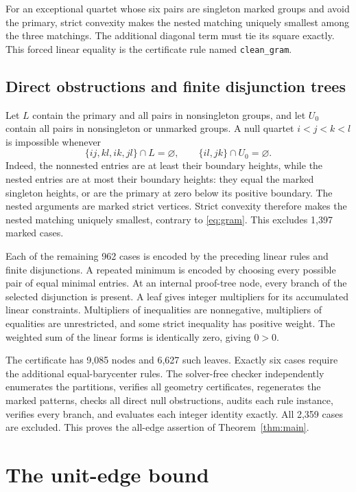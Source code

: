 \documentclass[11pt]{article}
\theoremstyle{remark}\newtheorem{remark}[theorem]{Remark}
\begin{document}
For an exceptional quartet whose six pairs are singleton marked groups
and avoid the primary, strict convexity makes the nested matching
uniquely smallest among the three matchings. The additional diagonal
term must tie its square exactly. This forced linear equality is the
certificate rule named \texttt{clean\_gram}.

\subsection{Direct obstructions and finite disjunction trees}

Let $L$ contain the primary and all pairs in nonsingleton groups, and
let $U_0$ contain all pairs in nonsingleton or unmarked groups. A null
quartet $i<j<k<l$ is impossible whenever
\[
 \{ij,kl,ik,jl\}\cap L=\varnothing,
 \qquad \{il,jk\}\cap U_0=\varnothing.
\]
Indeed, the nonnested entries are at least their boundary heights,
while the nested entries are at most their boundary heights: they
equal the marked singleton heights, or are the primary at zero below
its positive boundary. The nested arguments are marked strict
vertices. Strict convexity therefore makes the nested matching
uniquely smallest, contrary to \eqref{eq:gram}. This excludes 1,397
marked cases.

Each of the remaining 962 cases is encoded by the preceding linear
rules and finite disjunctions. A repeated minimum is encoded by choosing
every possible pair of equal minimal entries. At an internal proof-tree
node, every branch of the selected disjunction is present. A leaf gives
integer multipliers for its accumulated linear constraints. Multipliers
of inequalities are nonnegative, multipliers of equalities are unrestricted,
and some strict inequality has positive weight. The weighted sum of
the linear forms is identically zero, giving $0>0$.

The certificate has 9,085 nodes and 6,627 such leaves. Exactly six cases
require the additional equal-barycenter rules. The solver-free checker
independently enumerates the partitions, verifies all geometry certificates,
regenerates the marked patterns, checks all direct null obstructions,
audits each rule instance, verifies every branch, and evaluates each
integer identity exactly. All 2,359 cases are excluded. This proves
the all-edge assertion of Theorem~\ref{thm:main}.

\section{The unit-edge bound}
\end{document}
